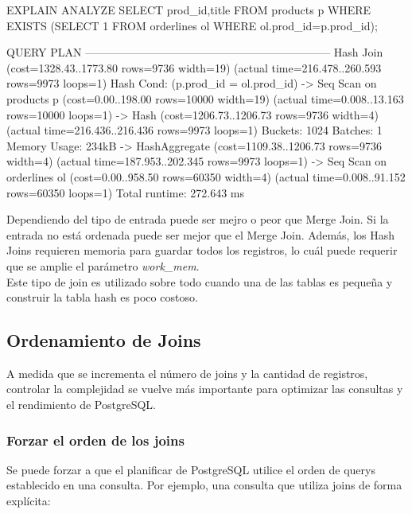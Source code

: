 \begin{pyglist}
EXPLAIN ANALYZE SELECT prod_id,title FROM products p WHERE EXISTS 
(SELECT 1 FROM orderlines ol WHERE ol.prod_id=p.prod_id);

 QUERY PLAN                                                             
------------------------------------------------------------------
 Hash Join  (cost=1328.43..1773.80 rows=9736 width=19) 
           (actual time=216.478..260.593 rows=9973 loops=1)
   Hash Cond: (p.prod_id = ol.prod_id)
   ->  Seq Scan on products p  (cost=0.00..198.00 rows=10000 width=19)
                         (actual time=0.008..13.163 rows=10000 loops=1)
   ->  Hash  (cost=1206.73..1206.73 rows=9736 width=4) 
                       (actual time=216.436..216.436 rows=9973 loops=1)
         Buckets: 1024  Batches: 1  Memory Usage: 234kB
         ->  HashAggregate  (cost=1109.38..1206.73 rows=9736 width=4)
                      (actual time=187.953..202.345 rows=9973 loops=1)
           ->  Seq Scan on orderlines ol (cost=0.00..958.50 rows=60350 width=4)
                                 (actual time=0.008..91.152 rows=60350 loops=1)
 Total runtime: 272.643 ms

\end{pyglist}
           
Dependiendo del tipo de entrada puede ser mejro o peor que Merge Join. Si la entrada no está ordenada puede ser mejor que el Merge Join. Además, los Hash Joins requieren memoria para guardar todos los registros, lo cuál puede requerir que se amplie el parámetro \textit{work\_mem}.\\

Este tipo de join es utilizado sobre todo cuando una de las tablas es pequeña y construir la tabla hash es poco costoso.

\subsection{Ordenamiento de Joins}           

A medida que se incrementa el número de joins y la cantidad de registros, controlar la complejidad se vuelve más importante para optimizar las consultas y el rendimiento de PostgreSQL.

\subsubsection{Forzar el orden de los joins}

Se puede forzar a que el planificar de PostgreSQL utilice el orden de querys establecido en una consulta. Por ejemplo, una consulta que utiliza joins de forma explícita:\\

